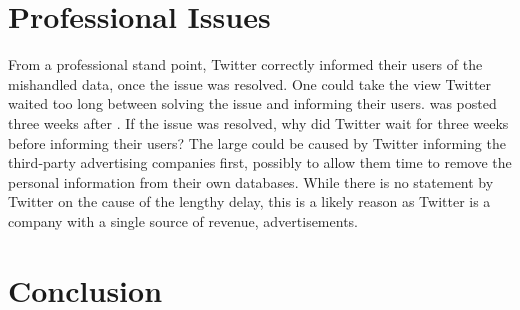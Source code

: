 \documentclass[a4paper, 11pt]{article}
\begin{document}
\section{Professional Issues}
From a professional stand point, Twitter correctly informed their users of the mishandled data, once the issue was resolved.
One could take the view Twitter waited too long between solving the issue and informing their users.
\textcite{support_twitter_2019} was posted three weeks after \textcite{support_personal_2019}.
If the issue was resolved, why did Twitter wait for three weeks before informing their users?
The large could be caused by Twitter informing the third-party advertising companies first, possibly to allow them time to remove the personal information from their own databases.
While there is no statement by Twitter on the cause of the lengthy delay, this is a likely reason as Twitter is a company with a single source of revenue, advertisements.

\section{Conclusion}

\printbibliography
\end{document}
